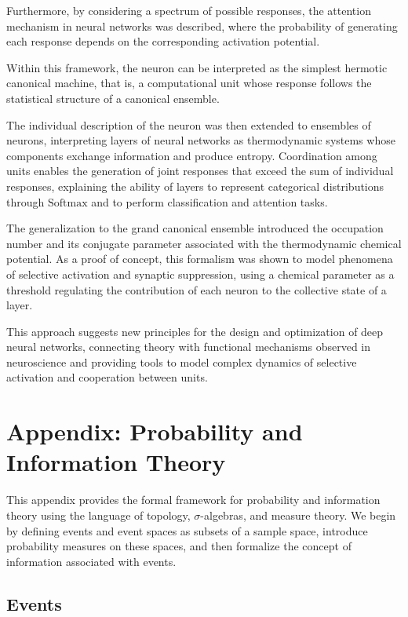 \documentclass[12pt]{article}
\begin{document}
Furthermore, by considering a spectrum of possible responses, the attention mechanism in neural networks was described, where the probability of generating each response depends on the corresponding activation potential.

Within this framework, the neuron can be interpreted as the simplest hermotic canonical machine, that is, a computational unit whose response follows the statistical structure of a canonical ensemble.

The individual description of the neuron was then extended to ensembles of neurons, interpreting layers of neural networks as thermodynamic systems whose components exchange information and produce entropy. Coordination among units enables the generation of joint responses that exceed the sum of individual responses, explaining the ability of layers to represent categorical distributions through $\text{Softmax}$ and to perform classification and attention tasks.

The generalization to the grand canonical ensemble introduced the occupation number and its conjugate parameter associated with the thermodynamic chemical potential. As a proof of concept, this formalism was shown to model phenomena of selective activation and synaptic suppression, using a chemical parameter as a threshold regulating the contribution of each neuron to the collective state of a layer.

This approach suggests new principles for the design and optimization of deep neural networks, connecting theory with functional mechanisms observed in neuroscience and providing tools to model complex dynamics of selective activation and cooperation between units.
\newpage
\appendix

\section*{Appendix: Probability and Information Theory}

This appendix provides the formal framework for probability and information theory using 
the language of topology, $\sigma$-algebras, and measure theory. We begin by defining events 
and event spaces as subsets of a sample space, introduce probability measures on these 
spaces, and then formalize the concept of information associated with events.

\subsection*{Events}
\end{document}
